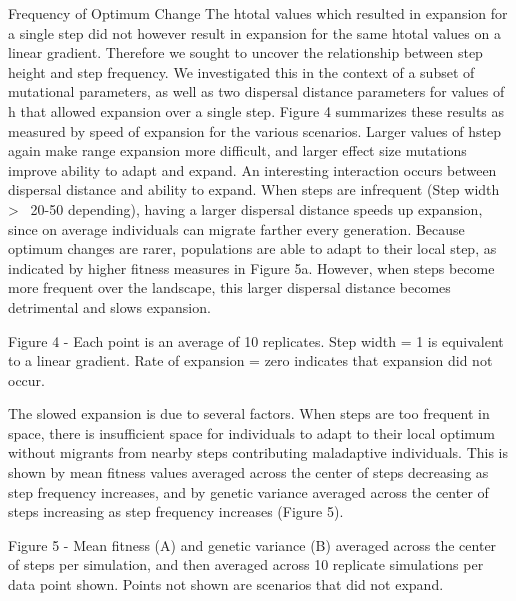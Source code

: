 Frequency of Optimum Change
	The htotal values which resulted in expansion for a single step did not however result 
	in expansion for the same htotal values on a linear gradient. Therefore we sought to 
	uncover the relationship between step height and step frequency. We investigated this 
	in the context of a subset of mutational parameters, as well as two dispersal distance 
	parameters for values of h that allowed expansion over a single step.
	Figure 4 summarizes these results as measured by speed of expansion for the various 
	scenarios. Larger values of hstep again make range expansion more difficult, and larger 
	effect size mutations improve ability to adapt and expand. An interesting interaction 
	occurs between dispersal distance and ability to expand. When steps are infrequent 
	(Step width > ~20-50 depending), having a larger dispersal distance speeds up expansion, 
	since on average individuals can migrate farther every generation. Because optimum 
	changes are rarer, populations are able to adapt to their local step, as indicated by 
	higher fitness measures in Figure 5a. However, when steps become more frequent over 
	the landscape, this larger dispersal distance becomes detrimental and slows expansion.
	
Figure 4 - Each point is an average of 10 replicates. Step width = 1 is equivalent to a 
linear gradient. Rate of expansion = zero indicates that expansion did not occur.

The slowed expansion is due to several factors. When steps are too frequent in space, there 
is insufficient space for individuals to adapt to their local optimum without migrants from 
nearby steps contributing maladaptive individuals. This is shown by mean fitness values 
averaged across the center of steps decreasing as step frequency increases, and by genetic 
variance averaged across the center of steps increasing as step frequency increases (Figure 5).

Figure 5 - Mean fitness (A) and genetic variance (B) averaged across the center of steps per 
simulation, and then averaged across 10 replicate simulations per data point shown. Points 
not shown are scenarios that did not expand.

